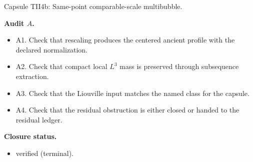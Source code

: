 \documentclass[11pt]{amsart}
\newcommand{\capsulefield}[1]{\par\smallskip\noindent\textbf{#1.}\ }
\begin{document}
\begin{proofcapsule}{Capsule TII4b: Same-point comparable-scale multibubble.}
  \capsulefield{Audit \(A\)}
  \begin{itemize}[leftmargin=1.8em]
  \item A1. Check that rescaling produces the centered ancient profile with the declared normalization.
  \item A2. Check that compact local $L^3$ mass is preserved through subsequence extraction.
  \item A3. Check that the Liouville input matches the named class for the capsule.
  \item A4. Check that the residual obstruction is either closed or handed to the residual ledger.
  \end{itemize}
  \capsulefield{Closure status}
  \begin{itemize}[leftmargin=1.8em]
  \item verified (terminal).
  \end{itemize}
\end{proofcapsule}
\end{document}
